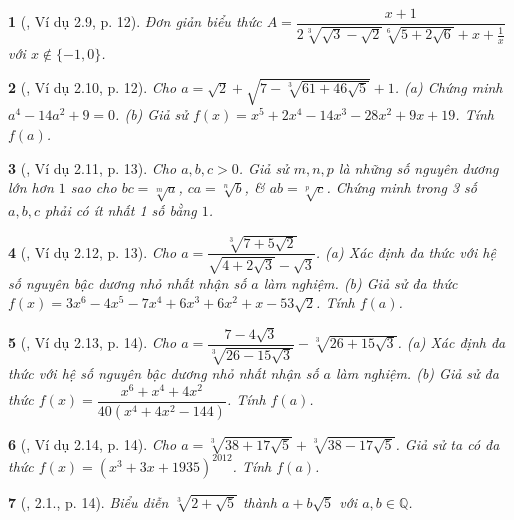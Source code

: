 \documentclass{article}
\newtheorem{baitoan}{}
\begin{document}
\begin{baitoan}[\cite{TLCT_THCS_Toan_9_dai_so}, Ví dụ 2.9, p. 12]
	Đơn giản biểu thức $A = \dfrac{x + 1}{2\sqrt[3]{\sqrt{3} - \sqrt{2}}\sqrt[6]{5 + 2\sqrt{6}} + x + \frac{1}{x}}$ với $x\notin\{-1,0\}$.
\end{baitoan}

\begin{baitoan}[\cite{TLCT_THCS_Toan_9_dai_so}, Ví dụ 2.10, p. 12]
	Cho $a = \sqrt{2} + \sqrt{7 - \sqrt[3]{61 + 46\sqrt{5}}} + 1$. (a) Chứng minh $a^4 - 14a^2 + 9 = 0$. (b) Giả sử $f(x) = x^5 + 2x^4 - 14x^3 - 28x^2 + 9x + 19$. Tính $f(a)$.
\end{baitoan}

\begin{baitoan}[\cite{TLCT_THCS_Toan_9_dai_so}, Ví dụ 2.11, p. 13]
	Cho $a,b,c > 0$. Giả sử $m,n,p$ là những số nguyên dương lớn hơn $1$ sao cho $bc = \sqrt[m]{a}$, $ca = \sqrt[n]{b}$, \& $ab = \sqrt[p]{c}$. Chứng minh trong 3 số $a,b,c$ phải có ít nhất 1 số bằng $1$.
\end{baitoan}

\begin{baitoan}[\cite{TLCT_THCS_Toan_9_dai_so}, Ví dụ 2.12, p. 13]
	Cho $a = \dfrac{\sqrt[3]{7 + 5\sqrt{2}}}{\sqrt{4 + 2\sqrt{3}} - \sqrt{3}}$. (a) Xác định đa thức với hệ số nguyên bậc dương nhỏ nhất nhận số $a$ làm nghiệm. (b) Giả sử đa thức $f(x) = 3x^6 - 4x^5 - 7x^4 + 6x^3 + 6x^2 + x - 53\sqrt{2}$. Tính $f(a)$.
\end{baitoan}

\begin{baitoan}[\cite{TLCT_THCS_Toan_9_dai_so}, Ví dụ 2.13, p. 14]
	Cho $a = \dfrac{7- 4\sqrt{3}}{\sqrt[3]{26 - 15\sqrt{3}}} - \sqrt[3]{26 + 15\sqrt{3}}$. (a) Xác định đa thức với hệ số nguyên bậc dương nhỏ nhất nhận số $a$ làm nghiệm. (b) Giả sử đa thức $f(x) = \dfrac{x^6 + x^4 + 4x^2}{40(x^4 + 4x^2 - 144)}$. Tính $f(a)$.
\end{baitoan}

\begin{baitoan}[\cite{TLCT_THCS_Toan_9_dai_so}, Ví dụ 2.14, p. 14]
	Cho $a = \sqrt[3]{38 + 17\sqrt{5}} + \sqrt[3]{38 - 17\sqrt{5}}$. Giả sử ta có đa thức $f(x) = (x^3 + 3x + 1935)^{2012}$. Tính $f(a)$.
\end{baitoan}

\begin{baitoan}[\cite{TLCT_THCS_Toan_9_dai_so}, 2.1., p. 14]
	Biểu diễn $\sqrt[3]{2 + \sqrt{5}}$ thành $a + b\sqrt{5}$ với $a,b\in\mathbb{Q}$.
\end{baitoan}
\end{document}

